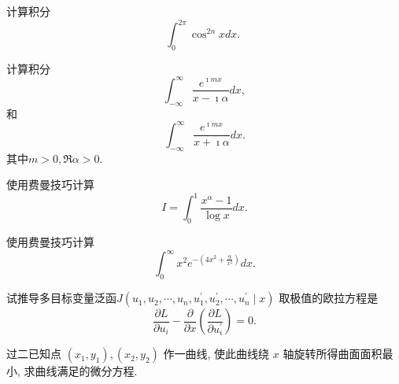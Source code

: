 \documentclass[10pt]{article}
\newenvironment{problem}[2][]{\begin{trivlist}
\item[\hskip \labelsep {\bfseries #1}\hskip \labelsep {\bfseries #2}]}{\end{trivlist}}
\begin{document}
\renewcommand{\labelenumi}{(\arabic{enumi})}
\renewcommand{\labelenumii}{(\arabic{enumi}.\arabic{enumii})}



 




\begin{problem}{5.1}
计算积分
$$
\int_0^{2 \pi} \cos ^{2 n} x d x \text {. }
$$
\end{problem}

\begin{problem}{5.2}
  计算积分
  $$
  \int_{-\infty}^{\infty} \frac{e^{\imath m x}}{x-\imath \alpha} d x,
  $$
  和
  $$
  \int_{-\infty}^{\infty} \frac{e^{\imath m x}}{x+\imath \alpha} d x.
  $$
  其中$m>0, \Re \alpha > 0$.
  \end{problem}
  
\begin{problem}{5.3}
    使用费曼技巧计算
    $$
    I = \int_0^1 \frac{x^\alpha-1}{\log x} d x . 
    $$
  \end{problem}
   
\begin{problem}{5.4}
     使用费曼技巧计算
     $$
     \int_0^{\infty} x^2 e^{-\left(4 x^2+\frac{9}{x^2}\right)} d x .
     $$
\end{problem}

\begin{problem}{5.5}
试推导多目标变量泛函$J\left(u_1, u_2, \cdots, u_n, u_1^{\prime}, u_2^{\prime}, \cdots, u_n^{\prime} \mid x\right)$
取极值的欧拉方程是
$$
\frac{\partial L}{\partial u_i}-\frac{\partial}{\partial x}\left(\frac{\partial L}{\partial u_i^{\prime}}\right)=0 .
$$
\end{problem}


\begin{problem}{5.6}
  过二已知点 $\left(x_1, y_1\right),\left(x_2, y_2\right)$ 作一曲线, 使此曲线绕 $x$ 轴旋转所得曲面面积最小, 求曲线满足的微分方程.
\end{problem}
\end{document}
